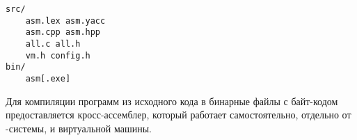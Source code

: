 \clearpage
{}\label{basm}\secdown

\begin{verbatim}
src/
    asm.lex asm.yacc
    asm.cpp asm.hpp
    all.c all.h
    vm.h config.h
bin/
    asm[.exe]
\end{verbatim}

\noindent
Для компиляции программ из исходного кода в бинарные файлы с байт-кодом
предоставляется кросс-ассемблер, который работает самостоятельно, отдельно от
\F-системы, и виртуальной машины.




\secup
